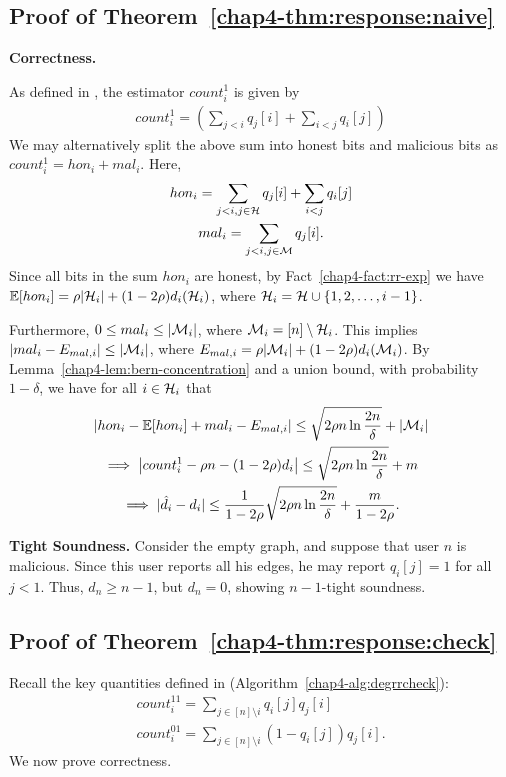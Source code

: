 \subsection{Proof of Theorem~\ref{chap4-thm:response:naive}}\label{chap4-app:thm:response:naive}
\noindent \textbf{Correctness.}

As defined in \DegRRNaive{}, the estimator $count_i^1$ is given by 
\begin{gather}count^1_i=(\sum_{j < i} q_j[i] + \sum_{i < j} q_i[j])\end{gather}
We may alternatively split the above sum into honest bits and malicious bits as $count^1_i = hon_i + mal_i$. Here, 
\begin{gather*}
hon_i = \sum_{j < i, j \in \mathcal{H}} q_j[i] + \sum_{i < j} q_i[j] \\
mal_i = \sum_{j < i, j \in \mathcal{M}} q_j[i].
\end{gather*}
Since all bits in the sum $hon_i$ are honest, by Fact~\ref{chap4-fact:rr-exp} we have $\operatorname{\mathbb{E}}[hon_i] = \rho|\mathcal{H}_i| + (1-2\rho) d_i(\mathcal{H}_i)$, where $\mathcal{H}_i = \mathcal{H} \cup \{1, 2, \ldots, i-1\}$. 

Furthermore, $0 \leq mal_i \leq |\mathcal{M}_i|$, where $\mathcal{M}_i = [n] \setminus \mathcal{H}_i$. This implies $|mal_i - E_{mal,i}| \leq |\mathcal{M}_i|$, where $E_{mal,i} = \rho|\mathcal{M}_i| + (1-2\rho) d_i(\mathcal{M}_i)$.
By Lemma~\ref{chap4-lem:bern-concentration} and a union bound, with probability $1-\delta$, we have for all $i \in \mathcal{H}_i$ that
\begin{gather*}
\left|hon_i - \operatorname{\mathbb{E}}[hon_i] + mal_i - E_{mal,i} \right| \leq  \sqrt{2\rho n \ln \frac{2n}{\delta}} + |\mathcal{M}_i| \\ 
\implies \left|count_i^1 - \rho n - (1-2\rho)d_i \right| \leq  \sqrt{2\rho n \ln \frac{2n}{\delta}} + m \\ 
\implies |\hat{d}_i - d_i | \leq \frac{1}{1-2\rho} \sqrt{2\rho n \ln \frac{2n}{\delta}} + \frac{m}{1-2\rho}.
\end{gather*}

\noindent\textbf{Tight Soundness.} Consider the empty graph, and suppose that user $n$ is malicious. Since this user reports all his edges, he may report $q_i[j] = 1$ for all $j < 1$. Thus, $\hat{d}_n \geq n-1$, but $d_n = 0$, showing $n-1$-tight soundness.

\subsection{Proof of Theorem~\ref{chap4-thm:response:check}} \label{chap4-app:b3a3}
Recall the key quantities defined in \DegRRCheck{} (Algorithm~\ref{chap4-alg:degrrcheck}):
\begin{gather}
      count_i^{11} = \sum_{j \in [n] \setminus i} q_{i}[j] q_{j}[i] \\
      count_i^{01} = \sum_{j \in [n] \setminus i} (1-q_{i}[j])q_{j}[i].
\end{gather}
We now prove correctness.

